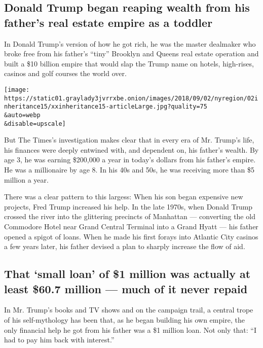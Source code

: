 \hypertarget{donald-trump-began-reaping-wealth-from-his-fathers-real-estate-empire-as-a-toddler}{%
\subsection{Donald Trump began reaping wealth from his father's real
estate empire as a
toddler}\label{donald-trump-began-reaping-wealth-from-his-fathers-real-estate-empire-as-a-toddler}}

In Donald Trump's version of how he got rich, he was the master
dealmaker who broke free from his father's ``tiny'' Brooklyn and Queens
real estate operation and built a \$10 billion empire that would slap
the Trump name on hotels, high-rises, casinos and golf courses the world
over.

\texttt{[image: https://static01.graylady3jvrrxbe.onion/images/2018/09/02/nyregion/02inheritance15/xxinheritance15-articleLarge.jpg?quality=75\\\&auto=webp\\\&disable=upscale]}

But The Times's investigation makes clear that in every era of Mr.
Trump's life, his finances were deeply entwined with, and dependent on,
his father's wealth. By age 3, he was earning \$200,000 a year in
today's dollars from his father's empire. He was a millionaire by age 8.
In his 40s and 50s, he was receiving more than \$5 million a year.

There was a clear pattern to this largess: When his son began expensive
new projects, Fred Trump increased his help. In the late 1970s, when
Donald Trump crossed the river into the glittering precincts of
Manhattan --- converting the old Commodore Hotel near Grand Central
Terminal into a Grand Hyatt --- his father opened a spigot of loans.
When he made his first forays into Atlantic City casinos a few years
later, his father devised a plan to sharply increase the flow of aid.

\hypertarget{that-small-loan-of-1-million-was-actually-at-least-607-million--much-of-it-never-repaid}{%
\subsection{That `small loan' of \$1 million was actually at least
\$60.7 million --- much of it never
repaid}\label{that-small-loan-of-1-million-was-actually-at-least-607-million--much-of-it-never-repaid}}

In Mr. Trump's books and TV shows and on the campaign trail, a central
trope of his self-mythology has been that, as he began building his own
empire, the only financial help he got from his father was a \$1 million
loan. Not only that: ``I had to pay him back with interest.''

